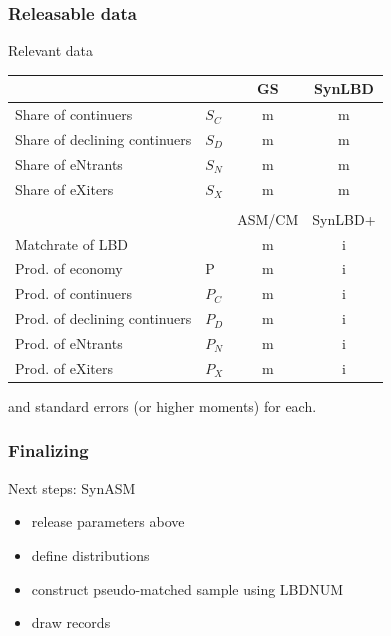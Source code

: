\begin{frame}
\frametitle{Releasable data}
\begin{block}{Relevant data}
\begin{tabular}{llcc}
&& GS  & SynLBD \\
\hline
Share of continuers & $S_C$ & m & m\\
Share of declining continuers & $S_D$ & m & m \\
Share of eNtrants & $S_N$ & m & m\\
Share of eXiters & $S_X$ & m & m\\
\hline
\\
&& ASM/CM & SynLBD+ \\
\alert{Matchrate of LBD} & & m & i \\
Prod. of economy & P & m & i\\
Prod. of continuers & $P_C$ & m &i\\
Prod. of declining continuers & $P_D$ & m & i \\
Prod. of eNtrants & $P_N$ & m & i\\
Prod. of eXiters & $P_X$ & m & i\\
\hline
\end{tabular}
and standard errors (or higher moments) for each.
\end{block}
\end{frame}


\begin{frame}
\frametitle{Finalizing}
\begin{block}{Next steps: SynASM}
\begin{itemize}[<+->]
\item release parameters above
\item define distributions
\item construct pseudo-matched sample using LBDNUM
\item draw records
\end{itemize}
\end{block}
\end{frame}

%
%
%
%




